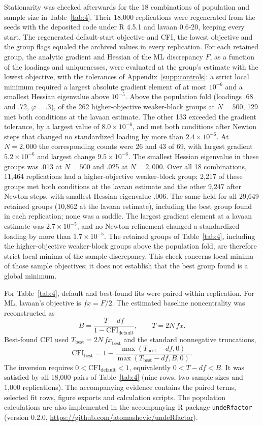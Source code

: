 Stationarity was checked afterwards for the 18 combinations of population and sample size in Table~\ref{tab:4}. Their 18,000 replications were regenerated from the seeds with the deposited code under R 4.5.1 and lavaan 0.6-20, keeping every start. The regenerated default-start objective and CFI, the lowest objective and the group flags equaled the archived values in every replication. For each retained group, the analytic gradient and Hessian of the ML discrepancy $F$, as a function of the loadings and uniquenesses, were evaluated at the group's estimate with the lowest objective, with the tolerances of Appendix~\ref{supp:controls}: a strict local minimum required a largest absolute gradient element of at most $10^{-6}$ and a smallest Hessian eigenvalue above $10^{-5}$. Above the population fold (loadings .68 and .72, $\varphi=.3$), of the 262 higher-objective weaker-block groups at $N=500$, 129 met both conditions at the lavaan estimate. The other 133 exceeded the gradient tolerance, by a largest value of $8.0\times10^{-6}$, and met both conditions after Newton steps that changed no standardized loading by more than $2.4\times10^{-6}$. At $N=2{,}000$ the corresponding counts were 26 and 43 of 69, with largest gradient $5.2\times10^{-6}$ and largest change $9.5\times10^{-6}$. The smallest Hessian eigenvalue in these groups was .013 at $N=500$ and .025 at $N=2{,}000$. Over all 18 combinations, 11,464 replications had a higher-objective weaker-block group; 2,217 of these groups met both conditions at the lavaan estimate and the other 9,247 after Newton steps, with smallest Hessian eigenvalue .006. The same held for all 29,649 retained groups (10,862 at the lavaan estimate), including the best group found in each replication; none was a saddle. The largest gradient element at a lavaan estimate was $2.7\times10^{-5}$, and no Newton refinement changed a standardized loading by more than $1.7\times10^{-5}$. The retained groups of Table~\ref{tab:4}, including the higher-objective weaker-block groups above the population fold, are therefore strict local minima of the sample discrepancy. This check concerns local minima of those sample objectives; it does not establish that the best group found is a global minimum.

For Table~\ref{tab:4}, default and best-found fits were paired within replication. For ML, lavaan's objective is $\mathit{fx}=F/2$. The estimated baseline noncentrality was reconstructed as
\[
B=\frac{T-\mathit{df}}{1-\mathrm{CFI}_{\mathrm{default}}},
\qquad T=2N\,\mathit{fx}.
\]
Best-found CFI used $T_{\mathrm{best}}=2N\,\mathit{fx}_{\mathrm{best}}$ and the standard nonnegative truncations,
\[
\mathrm{CFI}_{\mathrm{best}}
=1-\frac{\max(T_{\mathrm{best}}-\mathit{df},0)}
{\max(T_{\mathrm{best}}-\mathit{df},B,0)}.
\]
The inversion requires $0<\mathrm{CFI}_{\mathrm{default}}<1$, equivalently $0<T-\mathit{df}<B$. It was satisfied by all 18,000 pairs of Table~\ref{tab:4} (nine rows, two sample sizes and 1,000 replications). The accompanying evidence contains the paired terms, selected fit rows, figure exports and calculation scripts. The population calculations are also implemented in the accompanying R package \texttt{undeRfactor} (version 0.2.0, \url{https://github.com/atomashevic/undeRfactor}).

